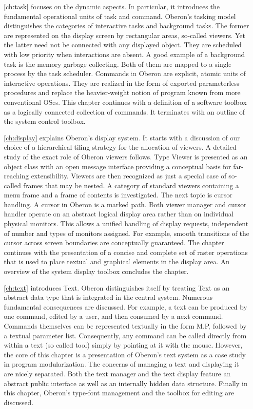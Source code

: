 \ref{ch:task} focuses on the dynamic aspects. In particular, it introduces the fundamental operational 
units of task and command.
Oberon's tasking model distinguishes the categories of interactive tasks and background tasks.
The former are represented on the display screen by rectangular areas, so-called viewers.
Yet the latter need not be connected with any displayed object. They are scheduled with low
priority when interactions are absent. A good example of a background task is the memory garbage
collecting. Both of them are mapped to a single process by the task
scheduler. Commands in Oberon are explicit, atomic units of interactive operations. They are
realized in the form of exported parameterless procedures and replace the heavier-weight notion of
program known from more conventional OSes. This chapter continues with a definition
of a software toolbox as a logically connected collection of commands. It terminates with an outline
of the system control toolbox.

\ref{ch:display} explains Oberon's display system. It starts with a discussion of our choice of a
hierarchical tiling strategy for the allocation of viewers. A detailed study of the exact role of Oberon
viewers follows. Type Viewer is presented as an object class with an open message interface
providing a conceptual basis for far-reaching extensibility. Viewers are then recognized as just a
special case of so-called frames that may be nested. A category of standard viewers containing a
menu frame and a frame of contents is investigated. The next topic is cursor handling. A cursor in
Oberon is a marked path. Both viewer manager and cursor handler operate on an abstract logical
display area rather than on individual physical monitors. This allows a unified handling of display
requests, independent of number and types of monitors assigned. For example, smooth transitions
of the cursor across screen boundaries are conceptually guaranteed. The chapter continues with
the presentation of a concise and complete set of raster operations that is used to place textual and
graphical elements in the display area. An overview of the system display toolbox concludes the chapter.

\ref{ch:text} introduces Text. Oberon distinguishes itself by treating Text as an abstract data type that
is integrated in the central system. Numerous fundamental consequences are discussed. For
example, a text can be produced by one command, edited by a user, and then consumed by a next
command. Commands themselves can be represented textually in the form M.P, followed by a
textual parameter list. Consequently, any command can be called directly from within a text (so called tool)
simply by pointing at it with the mouse. However, the core of this chapter is a
presentation of Oberon's text system as a case study in program modularization. The concerns of
managing a text and displaying it are nicely separated. Both the text manager and the text display
feature an abstract public interface as well as an internally hidden data structure. Finally in this
chapter, Oberon's type-font management and the toolbox for editing are discussed.

